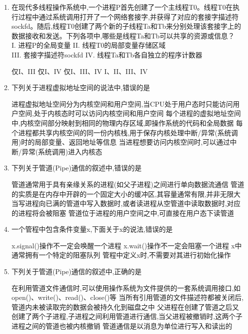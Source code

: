 \documentclass[12pt, a4paper, oneside, UTF8]{ctexbook}
\begin{document}
\begin{enumerate}
    \item 在现代多线程操作系统中,一个进程P首先创建了一个主线程T0。线程T0在执行过程中通过系统调用打开了一个网络套接字,并获得了对应的套接字描述符sockfd。随后,线程T0创建了两个新的子线程Ta和Tb来分别处理该套接字上的数据接收和发送。下列各项中,哪些是线程Ta和Tb可以共享的资源或信息？\\
    I. 进程P的全局变量\quad
    II. 线程T0的局部变量存储区域\\
    III. 套接字描述符sockfd\quad
    IV. 线程Ta和Tb各自独立的程序计数器
    \begin{choices}[2]
    \task 仅I、III
    \task 仅I、IV
    \task 仅I、III、IV
    \task I、II、III、IV
    \end{choices}


    \item 下列关于进程虚拟地址空间的说法中,错误的是
    \begin{choices}[1]
    \task 进程虚拟地址空间分为内核空间和用户空间,当CPU处于用户态时只能访问用户空间,处于内核态时可以访问内核空间和用户空间
    \task 每个进程的虚拟地址空间中,内核空间部分映射到相同的物理内存区域,即操作系统的代码和全局数据
    \task 每个进程都共享内核空间的同一份内核栈,用于保存内核处理中断/异常(系统调用)时的局部变量、返回地址等信息
    \task 当进程想要访问内核空间时,可以通过中断/异常(系统调用)进入内核态
    \end{choices}


    \item 下列关于管道(Pipe)通信的叙述中,错误的是
    \begin{choices}[1]
    \task 管道通常用于具有亲缘关系的进程(如父子进程)之间进行单向数据流通信
    \task 管道的实质是在内存中开辟的一个固定大小的缓冲区,其容量通常有限,并非无限大
    \task 当写进程向已满的管道中写入数据时,或者读进程从空管道中读取数据时,对应的进程将会被阻塞
    \task 管道位于进程的用户空间之中,可直接在用户态下读管道
    \end{choices}


    \item 一个管程中包含条件变量x,下面关于x的说法,错误的是
    \begin{choices}[1]
    \task x.signal()操作不一定会唤醒一个进程
    \task x.wait()操作不一定会阻塞一个进程
    \task x中通常拥有一个特定的阻塞队列
    \task 管程中定义x时,不需要对其进行初始化操作
    \end{choices}


    \item 下列关于管道(Pipe)通信的叙述中,正确的是
    \begin{choices}[1]
    \task 在利用管道文件通信时,可以使用操作系统为文件提供的一套系统调用接口,如open()、write()、read()、close()等
    \task 当所有引用管道的文件描述符都被关闭后,管道内未被读取完的数据会被持久化到磁盘之中
    \task 父进程在创建了管道之后又创建了两个子进程,子进程之间利用管道进行通信,当父进程被撤销时,这两个子进程之间的管道也被内核撤销
    \task 管道通信是以消息为单位进行写入和读出的
    \end{choices}



\end{enumerate}
\end{document}
